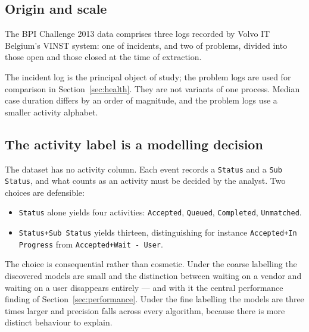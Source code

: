 \documentclass[12pt,a4paper]{article}
\newcommand{\act}[1]{\texttt{#1}}
\begin{document}
\subsection{Origin and scale}

The BPI Challenge 2013 data comprises three logs recorded by Volvo IT Belgium's
VINST system: one of incidents, and two of problems, divided into those open and
those closed at the time of extraction.

\begin{table}[H]
\centering

\caption{The three logs after loading. Case and event counts reproduce the
published figures exactly, which serves as a check on the loader.}
\label{tab:dataset}
\end{table}

The incident log is the principal object of study; the problem logs are used for
comparison in Section~\ref{sec:health}. They are not variants of one process.
Median case duration differs by an order of magnitude, and the problem logs use
a smaller activity alphabet.

\subsection{The activity label is a modelling decision}\label{sec:mode}

The dataset has no activity column. Each event records a \act{Status} and a
\act{Sub Status}, and what counts as an activity must be decided by the analyst.
Two choices are defensible:

\begin{itemize}
  \item \act{Status} alone yields four activities: \act{Accepted}, \act{Queued},
        \act{Completed}, \act{Unmatched}.
  \item \act{Status+Sub Status} yields thirteen, distinguishing for instance
        \act{Accepted+In Progress} from \act{Accepted+Wait - User}.
\end{itemize}

The choice is consequential rather than cosmetic. Under the coarse labelling the
discovered models are small and the distinction between waiting on a vendor and
waiting on a user disappears entirely --- and with it the central performance
finding of Section~\ref{sec:performance}. Under the fine labelling the models
are three times larger and precision falls across every algorithm, because there
is more distinct behaviour to explain.
\end{document}
